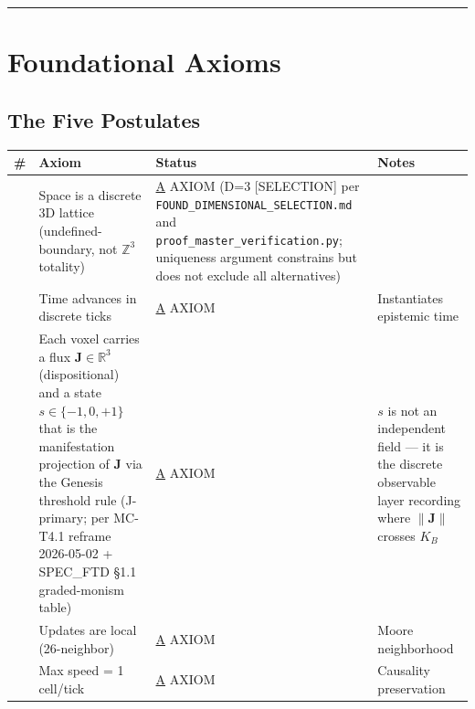 \documentclass[
  11pt,
  letterpaper,
  twoside,
  openright]{book}
\begin{document}
\begin{center}\rule{0.5\linewidth}{0.5pt}\end{center}

\section{Foundational Axioms}\label{foundational-axioms}

\subsection{The Five Postulates}\label{the-five-postulates-1}

\begin{longtable}[]{@{}
  >{\raggedright\arraybackslash}p{}
  >{\raggedright\arraybackslash}p{}
  >{\raggedright\arraybackslash}p{}
  >{\raggedright\arraybackslash}p{}@{}}
\toprule\noalign{}
\begin{minipage}[b]{\linewidth}\raggedright
\#
\end{minipage} & \begin{minipage}[b]{\linewidth}\raggedright
Axiom
\end{minipage} & \begin{minipage}[b]{\linewidth}\raggedright
Status
\end{minipage} & \begin{minipage}[b]{\linewidth}\raggedright
Notes
\end{minipage} \\
\midrule\noalign{}
\endhead
\bottomrule\noalign{}
\endlastfoot
1 & Space is a discrete 3D lattice (undefined-boundary, not
\(\mathbb{Z}^3\) totality) & \hyperref[a]{A} AXIOM (D=3 {[}SELECTION{]}
per \texttt{FOUND\_DIMENSIONAL\_SELECTION.md} and
\texttt{proof\_master\_verification.py}; uniqueness argument constrains
but does not exclude all alternatives) & \\
2 & Time advances in discrete ticks & \hyperref[a]{A} AXIOM &
Instantiates epistemic time \\
3 & Each voxel carries a flux \(\mathbf{J} \in \mathbb{R}^3\)
(dispositional) and a state \(s \in \{-1,0,+1\}\) that is the
manifestation projection of \(\mathbf{J}\) via the Genesis threshold
rule (J-primary; per MC-T4.1 reframe 2026-05-02 + SPEC\_FTD §1.1
graded-monism table) & \hyperref[a]{A} AXIOM & \(s\) is not an
independent field --- it is the discrete observable layer recording
where \(\|\mathbf{J}\|\) crosses \(K_B\) \\
4 & Updates are local (26-neighbor) & \hyperref[a]{A} AXIOM & Moore
neighborhood \\
5 & Max speed = 1 cell/tick & \hyperref[a]{A} AXIOM & Causality
preservation \\
\end{longtable}
\end{document}
